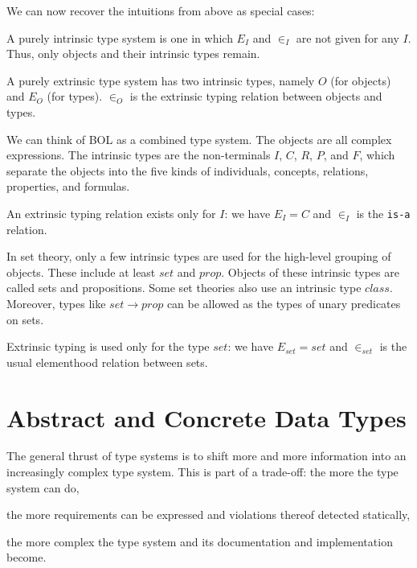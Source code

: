 We can now recover the intuitions from above as special cases:
\begin{compactitem}
 \item A purely intrinsic type system is one in which $E_I$ and $\in_I$ are not given for any $I$.
 Thus, only objects and their intrinsic types remain.
 \item A purely extrinsic type system has two intrinsic types, namely $O$ (for objects) and $E_O$ (for types).
 $\in_O$ is the extrinsic typing relation between objects and types.
\end{compactitem}

\begin{example}
We can think of BOL as a combined type system.
The objects are all complex expressions.
The intrinsic types are the non-terminals $I$, $C$, $R$, $P$, and $F$, which separate the objects into the five kinds of individuals, concepts, relations, properties, and formulas.

An extrinsic typing relation exists only for $I$: we have $E_I=C$ and $\in_I$ is the \texttt{is-a} relation.
\end{example}

\begin{example}
In set theory, only a few intrinsic types are used for the high-level grouping of objects.
These include at least $set$ and $prop$.
Objects of these intrinsic types are called sets and propositions.
Some set theories also use an intrinsic type $class$.
Moreover, types like $set\to prop$ can be allowed as the types of unary predicates on sets.

Extrinsic typing is used only for the type $set$: we have $E_{set}=set$ and $\in_{set}$ is the usual elementhood relation between sets.
\end{example}

\section{Abstract and Concrete Data Types}

The general thrust of type systems is to shift more and more information into an increasingly complex type system.
This is part of a trade-off: the more the type system can do,
\begin{compactitem}
 \item the more requirements can be expressed and violations thereof detected statically,
 \item the more complex the type system and its documentation and implementation become.
\end{compactitem}

